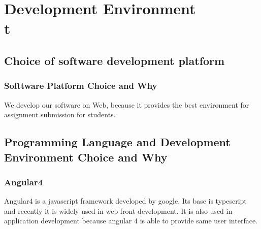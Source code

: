 \documentclass[10pt,journal,compsoc]{IEEEtran}
\begin{document}
\ifCLASSOPTIONcompsoc
{}
\else
\section{Development Environment\\t}
\label{sec:Development Environment\\}
\fi

\subsection{Choice of software development platform\\}

\subsubsection{Softtware Platform Choice and Why}
We develop our software on Web, because it provides the best environment for assignment submission for students.
\subsection{Programming Language and Development Environment Choice and Why\\}\subsubsection{Angular4\\}

Angular4 is a javascript framework developed by google. Its base is typescript and recently it is widely used in web front development. It is also used in application development because angular 4 is able to provide same user interface.\\
\end{document}
